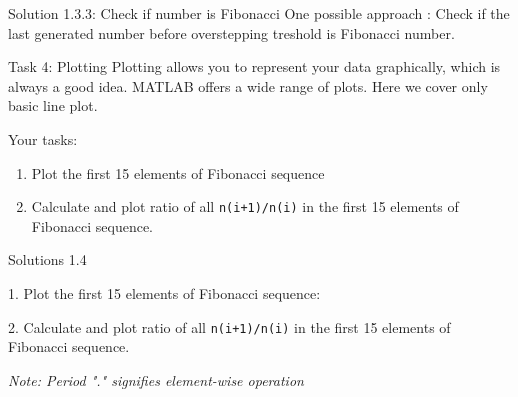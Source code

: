 \begin{frame}[fragile]{Solution 1.3.3: Check if number is Fibonacci}
One possible approach : Check if the last generated number before overstepping treshold is Fibonacci number.
\footnotesize
   
\end{frame}

\begin{frame}{Task 4: Plotting}
Plotting allows you to represent your data graphically, which is always a good idea. MATLAB offers a wide range of plots. Here we cover only basic line plot.

Your tasks: 
 \begin{enumerate}
     \item  Plot the first 15 elements of Fibonacci sequence
     \item  Calculate and plot ratio of all \lstinline{n(i+1)/n(i)} in the first 15 elements of Fibonacci sequence.  
 \end{enumerate}
\end{frame}

\begin{frame}[fragile]{Solutions 1.4}

\small
1. Plot the first 15 elements of Fibonacci sequence:

\vfill
2. Calculate and plot ratio of all \lstinline{n(i+1)/n(i)} in the first 15 elements of Fibonacci sequence. 

\vfill
\textit{Note: Period "." signifies element-wise operation}
\end{frame}
